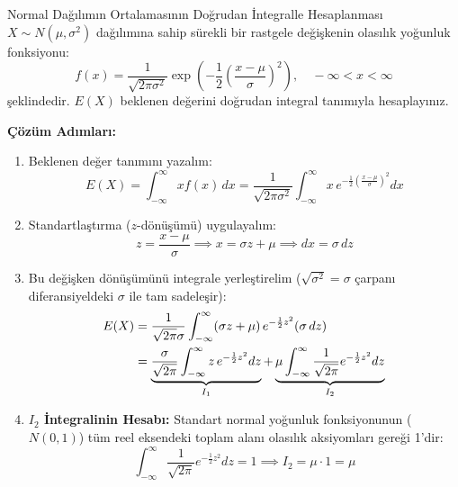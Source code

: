 \documentclass[12pt,a4paper]{article}
\begin{document}
\begin{ornek}{Normal Dağılımın Ortalamasının Doğrudan İntegralle Hesaplanması}
$X \sim N(\mu, \sigma^2)$ dağılımına sahip sürekli bir rastgele değişkenin olasılık yoğunluk fonksiyonu:
\begin{equation}
    f(x) = \frac{1}{\sqrt{2\pi\sigma^2}} \exp\left(-\frac{1}{2}\left(\frac{x - \mu}{\sigma}\right)^2\right), \quad -\infty < x < \infty
\end{equation}
şeklindedir. $E(X)$ beklenen değerini doğrudan integral tanımıyla hesaplayınız.

\bigskip
\textbf{Çözüm Adımları:}
\begin{enumerate}
    \item Beklenen değer tanımını yazalım:
    \begin{equation}
        E(X) = \int_{-\infty}^{\infty} x f(x) \, dx = \frac{1}{\sqrt{2\pi\sigma^2}} \int_{-\infty}^{\infty} x \, e^{-\frac{1}{2}\left(\frac{x - \mu}{\sigma}\right)^2} dx
    \end{equation}
    \item Standartlaştırma ($z$-dönüşümü) uygulayalım:
    \begin{equation}
        z = \frac{x - \mu}{\sigma} \implies x = \sigma z + \mu \implies dx = \sigma \, dz
    \end{equation}
    \item Bu değişken dönüşümünü integrale yerleştirelim ($\sqrt{\sigma^2} = \sigma$ çarpanı diferansiyeldeki $\sigma$ ile tam sadeleşir):
    \begin{align}
        E(X) &= \frac{1}{\sqrt{2\pi}\sigma} \int_{-\infty}^{\infty} (\sigma z + \mu) \, e^{-\frac{1}{2}z^2} (\sigma \, dz) \notag \\
        &= \underbrace{\frac{\sigma}{\sqrt{2\pi}} \int_{-\infty}^{\infty} z \, e^{-\frac{1}{2}z^2} dz}_{I_1} + \underbrace{\mu \int_{-\infty}^{\infty} \frac{1}{\sqrt{2\pi}} e^{-\frac{1}{2}z^2} dz}_{I_2}
    \end{align}

    \item \textbf{$I_2$ İntegralinin Hesabı:}  
    Standart normal yoğunluk fonksiyonunun ($N(0,1)$) tüm reel eksendeki toplam alanı olasılık aksiyomları gereği 1'dir:
    \begin{equation}
        \int_{-\infty}^{\infty} \frac{1}{\sqrt{2\pi}} e^{-\frac{1}{2}z^2} dz = 1 \implies I_2 = \mu \cdot 1 = \mu
    \end{equation}


\end{enumerate}
\end{ornek}
\end{document}
